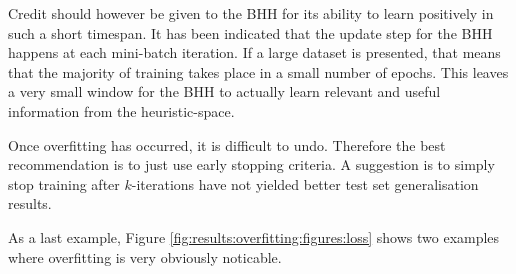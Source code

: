 Credit should however be given to the \Ac{BHH} for its ability to learn positively in such a short timespan. It has been indicated that the update step for the \Ac{BHH} happens at each mini-batch iteration. If a large dataset is presented, that means that the majority of training takes place in a small number of epochs. This leaves a very small window for the \Ac{BHH} to actually learn relevant and useful information from the heuristic-space.

Once overfitting has occurred, it is difficult to undo. Therefore the best recommendation is to just use early stopping criteria. A suggestion is to simply stop training after $k$-iterations have not yielded better test set generalisation results.

As a last example, Figure \ref{fig:results:overfitting:figures:loss} shows two examples where overfitting is very obviously noticable.

